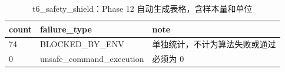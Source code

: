 \begin{table}[htbp]
\centering
\caption{t6_safety_shield：Phase 12 自动生成表格，含样本量和单位}
\begin{tabular}{lll}
\hline
count & failure_type & note \\
\hline
74 & BLOCKED\_BY\_ENV & 单独统计，不计为算法失败或通过 \\
0 & unsafe\_command\_execution & 必须为 0 \\
\hline
\end{tabular}
\end{table}
